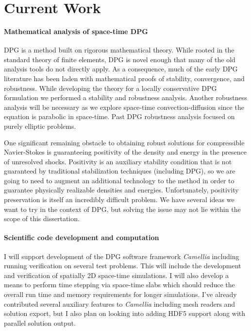 \documentclass[letterpaper]{article}
\begin{document}
\section*{Current Work}
\paragraph{Mathematical analysis of space-time DPG}
DPG is a method built on rigorous mathematical theory.
While rooted in the standard theory of finite elements, DPG is novel enough that many of the old analysis tools do not directly apply.
As a consequence, much of the early DPG literature has been laden with mathematical proofs of stability, convergence, and robustness.
While developing the theory for a locally conservative DPG formulation we performed a stability and robustness analysis.
Another robustness analysis will be necessary as we explore space-time convection-diffusion since the equation is parabolic in space-time.
Past DPG robustness analysis focused on purely elliptic problems.

One significant remaining obstacle to obtaining robust solutions for compressible Navier-Stokes is guaranteeing positivity of the density and
energy in the presence of unresolved shocks. 
Positivity is an auxiliary stability condition that is not guaranteed by traditional stabilization 
techniques (including DPG), so we are going to need to augment an additional technology to the method in order to guarantee physically
realizable densities and energies. 
Unfortunately, positivity preservation is itself an incredibly difficult problem. 
We have several ideas we want to try in the context of DPG, but solving the issue may not lie within the scope of this dissertation.

\paragraph{Scientific code development and computation}
I will support development of the DPG software framework \emph{Camellia}\cite{Roberts2011} including running verification on several test problems.
This will include the development and verification of spatially 2D space-time simulations.
I will also develop a means to perform time stepping via space-time slabs which should reduce the 
overall run time and memory requirements for longer simulations.
I've already contributed several auxiliary features to \emph{Camellia} including mesh readers and solution export, 
but I also plan on looking into adding HDF5 support along with parallel solution output.
\end{document}
